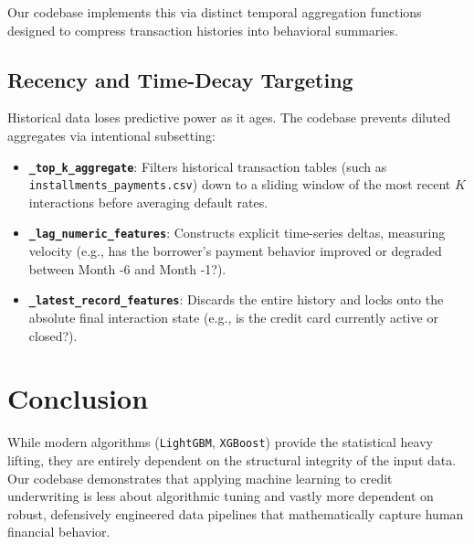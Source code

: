 \documentclass[11pt,a4paper]{article}
\begin{document}
Our codebase implements this via distinct temporal aggregation functions designed to compress transaction histories into behavioral summaries.

\subsection{Recency and Time-Decay Targeting}
Historical data loses predictive power as it ages. The codebase prevents diluted aggregates via intentional subsetting:
\begin{itemize}
    \item \textbf{\texttt{\_top\_k\_aggregate}}: Filters historical transaction tables (such as \texttt{installments\_payments.csv}) down to a sliding window of the most recent $K$ interactions before averaging default rates.
    \item \textbf{\texttt{\_lag\_numeric\_features}}: Constructs explicit time-series deltas, measuring velocity (e.g., has the borrower's payment behavior improved or degraded between Month -6 and Month -1?).
    \item \textbf{\texttt{\_latest\_record\_features}}: Discards the entire history and locks onto the absolute final interaction state (e.g., is the credit card currently active or closed?).
\end{itemize}

\section{Conclusion}
While modern algorithms (\texttt{LightGBM}, \texttt{XGBoost}) provide the statistical heavy lifting, they are entirely dependent on the structural integrity of the input data. Our codebase demonstrates that applying machine learning to credit underwriting is less about algorithmic tuning and vastly more dependent on robust, defensively engineered data pipelines that mathematically capture human financial behavior.
\end{document}
